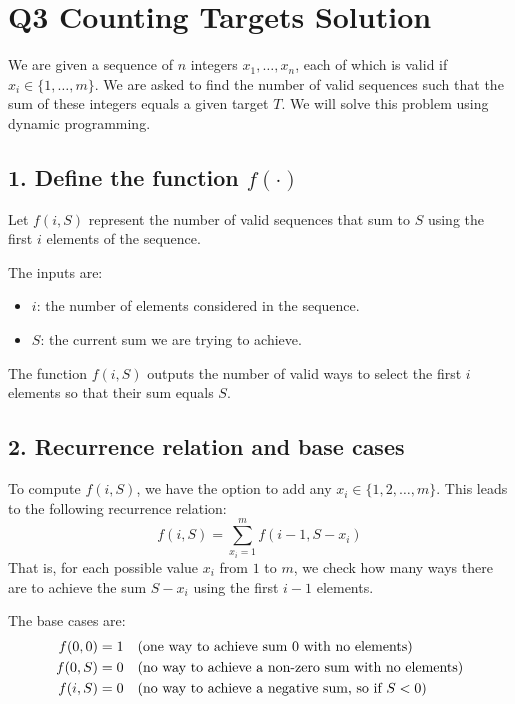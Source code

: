 \documentclass[11pt]{article}
\begin{document}
\newpage


\section*{Q3 Counting Targets Solution}

We are given a sequence of \( n \) integers \( x_1, \dots, x_n \), each of which is valid if \( x_i \in \{1, \dots, m\} \). We are asked to find the number of valid sequences such that the sum of these integers equals a given target \( T \). We will solve this problem using dynamic programming.

\subsection*{1. Define the function \( f(\cdot) \)}
Let \( f(i, S) \) represent the number of valid sequences that sum to \( S \) using the first \( i \) elements of the sequence.

The inputs are:
\begin{itemize}
    \item \( i \): the number of elements considered in the sequence.
    \item \( S \): the current sum we are trying to achieve.
\end{itemize}

The function \( f(i, S) \) outputs the number of valid ways to select the first \( i \) elements so that their sum equals \( S \).

\subsection*{2. Recurrence relation and base cases}
To compute \( f(i, S) \), we have the option to add any \( x_i \in \{1, 2, \dots, m\} \). This leads to the following recurrence relation:
\[
f(i, S) = \sum_{x_i=1}^{m} f(i-1, S - x_i)
\]
That is, for each possible value \( x_i \) from \( 1 \) to \( m \), we check how many ways there are to achieve the sum \( S - x_i \) using the first \( i-1 \) elements.

The base cases are:
\begin{align*}
f(0, 0) &= 1 \quad \text{(one way to achieve sum 0 with no elements)} \\
f(0, S) &= 0 \quad \text{(no way to achieve a non-zero sum with no elements)} \\
f(i, S) &= 0 \quad \text{(no way to achieve a negative sum, so if \( S < 0 \))}
\end{align*}
\end{document}
